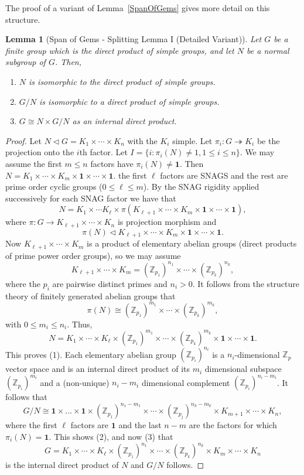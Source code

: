 \documentclass[a4paper,11pt]{amsart}
\newtheorem{lemma}[theorem]{Lemma}
\theoremstyle{definition}
\newcommand{\Z}{\mathbb{Z}}
\newcommand{\sur}{\twoheadrightarrow}
\newcommand{\1}{{\mathbf 1}}
\begin{document}
The proof of a variant of Lemma~\ref{SpanOfGems} gives more detail on this structure. 
\begin{lemma}[Span of Gems - Splitting Lemma I (Detailed Variant)]\label{detailedSpanOfGems}
Let $G$ be a finite group which is the direct product of simple groups, and let $N$ be a normal subgroup of $G$. Then, 
\begin{enumerate}
\item  \label{normalsubgroup}
$N$ is isomorphic to the direct product of simple groups.
\item  \label{quotient}
 $G/N$ is isomorphic to a direct product of simple groups.
\item  $G \cong N \times G/N$ as an internal direct product.
\end{enumerate}
\end{lemma}
\begin{proof} 
Let $N \lhd G= K_1 \times \cdots \times K_n$ with the $K_i$ simple. 
Let $\pi_i: G\sur K_i$ be the projection onto the $i$th factor.  
Let $I=\{i : \pi_i(N) \neq 1, 1\leq i \leq n\}$.  We may assume 
the first $m \leq n$ factors have $\pi_i(N)\neq \1$. 
Then $N=K_1 \times \cdots \times K_m\times \1 \times \cdots \times \1$.
the first $\ell$ factors are SNAGS and the rest are prime order cyclic groups ($0\leq \ell \leq m$).
By the SNAG rigidity applied successively for each SNAG factor we have that
$$N=K_1 \times \cdots K_{\ell} \times \pi(K_{\ell+1} \times \cdots \times K_m \times \1 \times \cdots \times \1),$$
where   $\pi: G \rightarrow K_{\ell+1} \times \cdots \times K_n$ is projection morphism and
$$\pi(N) \lhd  K_{\ell+1} \times \cdots \times K_m \times \1 \times \cdots \times \1.$$
Now $ K_{\ell+1} \times \cdots \times K_m $ is a product of elementary abelian groups (direct products of prime power order groups), so we may assume $$ K_{\ell+1} \times \cdots \times K_m = (\Z_{p_1})^{n_1} \times \cdots \times (\Z_{p_k})^{n_k},$$
where the $p_i$ are pairwise distinct primes and $n_i>0$. 
It follows from the structure theory of finitely generated abelian groups that
$$\pi(N)\cong (\Z_{p_1})^{m_1} \times \cdots \times (\Z_{p_k})^{m_k},$$
with $0\leq m_i \leq n_i$.  Thus, 
$$N = K_1 \times \cdots \times K_{\ell} \times (\Z_{p_1})^{m_1} \times \cdots \times (\Z_{p_k})^{m_k} \times \1 \times \cdots \times \1.$$
This proves (1). 
Each elementary abelian group  $(\Z_{p_i})^{n_i} $ is a $n_i$-dimensional $\Z_p$ vector space 
and is an internal direct product of its $m_i$ dimensional subspace $(\Z_{p_i})^{m_i}$ and a (non-unique) $n_i-m_i$ dimensional complement $(\Z_{p_i})^{n_i-m_i} $.
It follows that $$G/N\cong \1 \times \dots \times \1 \times (\Z_{p_1})^{n_1-m_1} \times \cdots \times (\Z_{p_j})^{n_k-m_k} \times  K_{m+1} \times \cdots \times K_n,$$
where the first $\ell$ factors are $\1$ and the last $n-m$ are the factors for which $\pi_i(N)=\1$.  This shows (2), and now (3) that 
$$G=K_1 \times \cdots \times K_{\ell} \times (\Z_{p_1})^{n_1} \times \cdots \times (\Z_{p_k})^{n_k} \times K_m \times \cdots \times K_n$$  is the internal direct product of $N$ and $G/N$ follows.
\end{proof}
\end{document}
